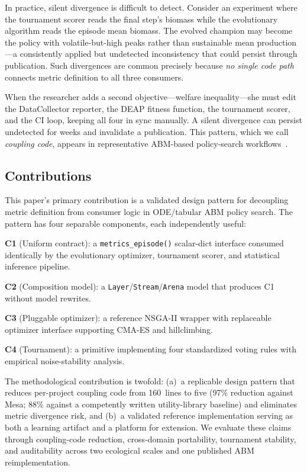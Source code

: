 \documentclass{wscpaperproc}
\begin{document}
In practice, silent divergence is difficult to detect. Consider an experiment
where the tournament scorer reads the final step's biomass while the
evolutionary algorithm reads the episode mean biomass. The evolved champion may
become the policy with volatile-but-high peaks rather than sustainable mean
production---a consistently applied but undetected inconsistency that could
persist through publication. Such divergences are common precisely because
\emph{no single code path} connects metric definition to all three consumers.

When the researcher adds a second objective---welfare inequality---she must edit
the DataCollector reporter, the DEAP fitness function, the tournament scorer, and
the CI loop, keeping all four in sync manually. A silent divergence can persist
undetected for weeks and invalidate a publication. This pattern, which we call
\emph{coupling code}, appears in representative ABM-based policy-search
workflows~\cite{pangallo2019best,capri2023transport}.

\subsection{Contributions}

This paper's primary contribution is a validated design pattern for decoupling
metric definition from consumer logic in ODE/tabular ABM policy search. The
pattern has four separable components, each independently useful:

\textbf{C1} (Uniform contract): a \texttt{metrics\_episode()} scalar-dict
interface consumed identically by the evolutionary optimizer, tournament scorer,
and statistical inference pipeline.

\textbf{C2} (Composition model): a \texttt{Layer}/\texttt{Stream}/\texttt{Arena}
model that produces C1 without model rewrites.

\textbf{C3} (Pluggable optimizer): a reference NSGA-II wrapper with replaceable
optimizer interface supporting CMA-ES and hillclimbing.

\textbf{C4} (Tournament): a primitive implementing four standardized voting rules
with empirical noise-stability analysis.

The methodological contribution is twofold: (a)~a replicable design pattern
that reduces per-project coupling code from 160~lines to five (97\% reduction
against Mesa; 88\% against a competently written utility-library baseline) and
eliminates metric divergence risk, and (b)~a validated reference implementation
serving as both a learning artifact and a platform for extension. We evaluate
these claims through coupling-code reduction, cross-domain portability,
tournament stability, and auditability across two ecological scales and one
published ABM reimplementation.
\end{document}

